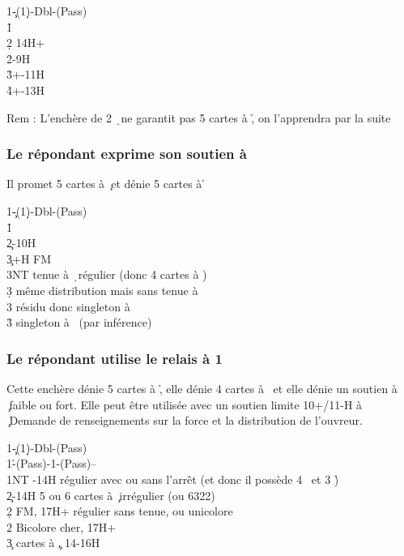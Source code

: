 \documentclass[a4paper]{article}
\begin{document}
\begin{bidtable}
1\c-(1\d)-Dbl-(Pass)\\
1\h\+\\
2\d \> 14H+\\
2\h {}-9H\\
3\h {}+-11H\\
4\h {}+-13H\-
\end{bidtable}

Rem : L’enchère de 2 \d\ ne garantit pas 5 cartes à \h , on l’apprendra par la suite

\subsubsection{Le répondant exprime son soutien à \pdfc}

Il promet 5 cartes à \c\ et dénie 5 cartes à \h 

\begin{bidtable}
1\c-(1\d)-Dbl-(Pass)\\
1\h\+\\
2\c {}-10H\\
3\c {}+H FM\+\\
3NT \> tenue à \d\ régulier (donc 4 cartes à \s )\\
3\d \> même distribution mais sans tenue à \d \\
3\s \> résidu donc singleton à \d \\
3\h \> singleton à \s\ (par inférence)\-\-
\end{bidtable}

\subsubsection{Le répondant utilise le relais à 1 \pdfs}

Cette enchère dénie 5 cartes à \h , elle dénie 4 cartes à \s\ et elle dénie un soutien à \c\ faible ou fort.
Elle peut être utilisée avec un soutien limite 10+/11-H à \c\ 
Demande de renseignements sur la force et la distribution de l’ouvreur.

\begin{bidtable}
1\c-(1\d)-Dbl-(Pass)\\
1\h-(Pass)-1\s-(Pass)--\\
1NT -14H régulier avec ou sans l’arrêt (et donc il possède 4 \s\ et 3 \h )\\
2\c \> 12-14H 5 ou 6 cartes à \c\ irrégulier (ou 6322)\\
2\d \> FM, 17H+ régulier sans tenue, ou unicolore \c \\
2\s \> Bicolore cher, 17H+\\
3\c {} cartes à \c , 14-16H
\end{bidtable}
\end{document}

